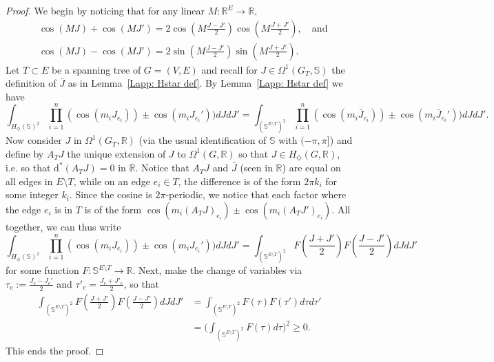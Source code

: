 \documentclass[11pt, reqno]{amsart}
\numberwithin{equation}{section}
\theoremstyle{definition}
\theoremstyle{remark}
\newcommand{\RR}{\mathbb{R}}
\renewcommand{\d}{\mathrm{d}}
\newcommand{\J}{J}
\newcommand{\Hstar}{\ensuremath{H_{\Diamond}} }
\begin{document}
\begin{proof}
	We begin by noticing that for any linear $M: \RR^{E} \to \RR$,
	\begin{align*}
		&\cos(M \J) + \cos(M \J') = 2\cos\left(M \frac{\J - \J'}{2}\right) \cos\left(M\frac{\J + \J'}{2}\right), \quad \text{and}\\
		&\cos( M \J) - \cos(M \J') = 2\sin\left( M \frac{\J - \J'}{2}\right) \sin\left(M \frac{\J + \J'}{2}\right). 
	\end{align*}
	Let $T\subset E$ be a spanning tree of $G = (V, E)$ and recall for $J \in \Omega^1(G_T, \mathbb{S})$ the definition of $\bar{J}$ as in Lemma~\ref{Lapp: Hstar def}. By Lemma~\ref{Lapp: Hstar def} we have
	\[
		\int_{\Hstar(\mathbb{S})^2} \prod_{i = 1}^n (\cos(m_i\J_{e_i}))  \pm \cos(m_i\J_{e_i}'))d\J d \J' = \int_{(\mathbb{S}^{E \setminus T})^2} \prod_{i = 1}^n (\cos(m_i\bar{\J}_{e_i}))  \pm \cos(m_i\bar{\J}_{e_i}'))d\J d \J'. 
	\]
	Now consider $J$ in $\Omega^1(G_T, \RR)$ (via the usual identification of $\mathbb{S}$ with $(-\pi, \pi]$) and define by $A_T J$ the unique extension of $J$ to $\Omega^1(G, \RR)$ so that $J \in \Hstar(G, \RR)$, i.e. so that  $\d^* (A_T J) = 0$ in $\RR$. Notice that $A_T J$ and $\bar{J}$ (seen in $\RR$) are equal on all edges in $E \setminus T$, while on an edge $e_i \in T$, the difference is of the form $2\pi k_{i}$ for some integer $k_i$.
	Since the cosine is $2\pi$-periodic, we notice that each factor where the edge $e_i$ is in $T$ is of the form $\cos(m_i(A_T \J)_{e_i}) \pm \cos(m_i(A_T \J')_{e_i})$. 
	All together, we can thus write
	\[
		\int_{\Hstar(\mathbb{S})^2} \prod_{i = 1}^n (\cos(m_i\J_{e_i}))  \pm \cos(m_i\J_{e_i}'))d\J d \J' = \int_{(\mathbb{S}^{E \setminus T})^2}F\left(\frac{\J + \J'}{2}\right)F\left(\frac{\J - \J'}{2}\right)d \J d \J'
	\]
	for some function $F: \mathbb{S}^{E \setminus T} \to \RR$. 	
	Next, make the change of variables via $\tau_e := \frac{\J_e - \J_e'}{2}$ and $\tau'_{e} = \frac{\J_e + \J'_e}{2}$, so that
	\begin{align*}
		\int_{(\mathbb{S}^{E \setminus T})^2}F\left(\frac{\J + \J'}{2}\right)F\left(\frac{\J - \J'}{2}\right)d \J d \J' &= \int_{ (\mathbb{S}^{E \setminus T})^2} F(\tau)F(\tau') d\tau d\tau' \\
		&= \Big(\int_{ (\mathbb{S}^{E \setminus T})^2} F(\tau)d\tau\Big)^2\geq 0.
	\end{align*}
	This ends the proof.
\end{proof}
\end{document}
